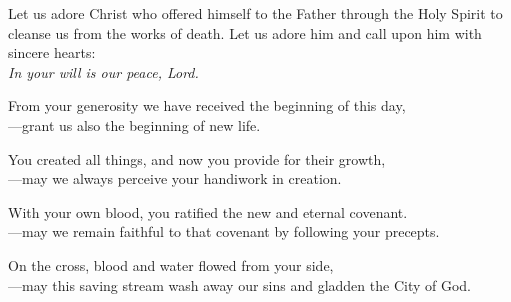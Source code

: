 \intercessions

\begin{raggedright}
Let us adore Christ who offered himself to the Father through the Holy Spirit to cleanse us from the works of death. Let us adore him and call upon him with sincere hearts:\\
\emph{In your will is our peace, Lord.}

\medskip
From your generosity we have received the beginning of this day,\\
{\color{red}---}grant us also the beginning of new life.

\medskip
You created all things, and now you provide for their growth,\\
{\color{red}---}may we always perceive your handiwork in creation.

\medskip
With your own blood, you ratified the new and eternal covenant.\\
{\color{red}---}may we remain faithful to that covenant by following your precepts.

\medskip
On the cross, blood and water flowed from your side,\\
{\color{red}---}may this saving stream wash away our sins and gladden the City of God.
\end{raggedright}